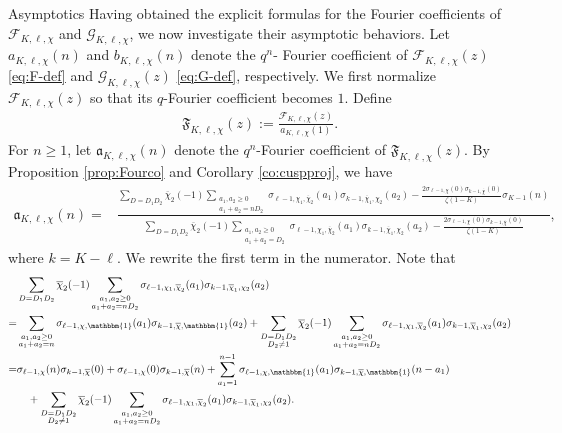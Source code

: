 \documentclass[11pt,letterpaper,reqno]{amsart}
\makeatletter
\numberwithin{figure}{section}
\numberwithin{table}{section}
\theoremstyle{definition}
\theoremstyle{plain}
\theoremstyle{definition}
\theoremstyle{definition}
\theoremstyle{remark}
\numberwithin{equation}{section}
\theoremstyle{remark}
\def\subsection{\@startsection{subsection}{2}%
  \z@{.5\linespacing\@plus.7\linespacing}{.3\linespacing}%
  {\normalfont\bfseries}}
\makeatother
\begin{document}
\subsection{Asymptotics}
Having obtained the explicit formulas for the Fourier coefficients of $\mathcal{F}_{K,\ell,\chi}$ and $\mathcal{G}_{K,\ell,\chi}$, we now investigate their asymptotic behaviors.  Let $a_{K,\ell,\chi}(n)$ and $b_{K,\ell,\chi}(n)$ denote the $q^n$- Fourier coefficient of $\mathcal{F}_{K,\ell,\chi}(z)$ \eqref{eq:F-def} and $\mathcal{G}_{K,\ell,\chi}(z)$ \eqref{eq:G-def}, respectively. We first normalize $\mathcal{F}_{K,\ell,\chi}(z)$ so that its $q$-Fourier coefficient becomes $1$. Define
 \begin{align}
     \mathfrak{F}_{K,\ell,\chi}(z):=\frac{\mathcal{F}_{K,\ell,\chi}(z)}{a_{K,\ell,\chi}(1)}. \label{eq:F-normalized}
 \end{align}
For $n\geq1$, let $\mathfrak{a}_{K,\ell,\chi}(n)$ denote the $q^n$-Fourier coefficient of $\mathfrak{F}_{K,\ell,\chi}(z)$. By Proposition \ref{prop:Fourco} and Corollary \ref{co:cuspproj}, we have 
\begin{align*} \mathfrak{a}_{K,\ell,\chi}(n)=&\frac{\sum\limits_{D=D_1D_2}\overline{\chi}_2(-1)\sum\limits_{\substack{a_1,a_2\geq0\\a_1+a_2=nD_2}}\sigma_{\ell-1,\chi_1,\overline{\chi}_{2}}(a_1)\sigma_{k-1,\overline{\chi}_{1},\chi_2}(a_2)-\frac{2\sigma_{\ell-1,\chi}(0)\sigma_{k-1,\overline{\chi}}(0)}{\zeta(1-K) }\sigma_{K-1}(n)}{\sum\limits_{D=D_1D_2}\overline{\chi}_2(-1)\sum\limits_{\substack{a_1,a_2\geq0\\a_1+a_2=D_2}}\sigma_{\ell-1,\chi_1,\overline{\chi}_{2}}(a_1)\sigma_{k-1,\overline{\chi}_{1},\chi_2}(a_2)-\frac{2\sigma_{\ell-1,\chi}(0)\sigma_{k-1,\overline{\chi}}(0)}{\zeta(1-K) }},
\end{align*}
where $k=K-\ell$. We rewrite the first term in the numerator. Note that
\begin{align*}
&\sum\limits_{D=D_1D_2}\overline{\chi}_2(-1)\sum\limits_{\substack{a_1,a_2\geq0\\a_1+a_2=nD_2}}\sigma_{\ell-1,\chi_1,\overline{\chi}_{2}}(a_1)\sigma_{k-1,\overline{\chi}_{1},\chi_2}(a_2)\\=
&\sum_{\substack{a_1,a_2\geq0\\a_1+a_2=n}}\sigma_{\ell-1,\chi,\mathbbm{1}}(a_1)\sigma_{k-1,\overline{\chi},\mathbbm{1}}(a_2)+\sum_{\substack{D=D_1D_2\\D_2\neq 1 }}\overline{\chi}_2(-1)\sum_{\substack{a_1,a_2\geq0\\a_1+a_2=nD_2}}\sigma_{\ell-1,\chi_1,\overline{\chi}_{2}}(a_1)\sigma_{k-1,\overline{\chi}_{1},\chi_2}(a_2)\\=&\sigma_{\ell-1,\chi}(n)\sigma_{k-1,\overline{\chi}}(0)+\sigma_{\ell-1,\chi}(0)\sigma_{k-1,\overline{\chi}}(n)+\sum_{a_1=1}^{n-1}\sigma_{\ell-1,\chi,\mathbbm{1}}(a_1)\sigma_{k-1,\overline{\chi},\mathbbm{1}}(n-a_1)\\&\quad+\sum_{\substack{D=D_1D_2\\D_2\neq 1 }}\overline{\chi}_2(-1)\sum_{\substack{a_1,a_2\geq0\\a_1+a_2=nD_2}}\sigma_{\ell-1,\chi_1,\overline{\chi}_{2}}(a_1)\sigma_{k-1,\overline{\chi}_{1},\chi_2}(a_2).
\end{align*}
\end{document}
